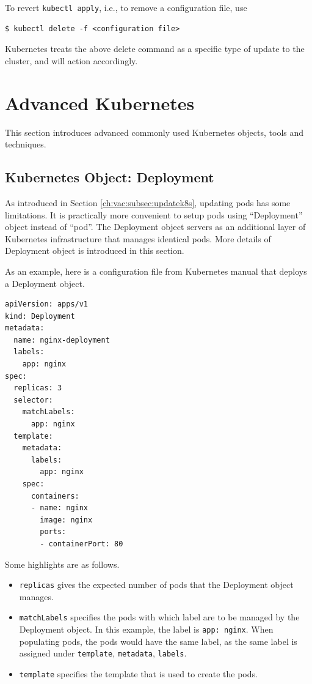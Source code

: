 To revert \verb|kubectl apply|, i.e., to remove a configuration file, use
\begin{lstlisting}
$ kubectl delete -f <configuration file>
\end{lstlisting}
Kubernetes treats the above delete command as a specific type of update to the cluster, and will action accordingly.

\section{Advanced Kubernetes}

This section introduces advanced commonly used Kubernetes objects, tools and techniques.

\subsection{Kubernetes Object: Deployment} \label{ch:vac:subsec:deployment}

As introduced in Section \ref{ch:vac:subsec:updatek8s}, updating pods has some limitations. It is practically more convenient to setup pods using ``Deployment'' object instead of ``pod''. The Deployment object servers as an additional layer of Kubernetes infrastructure that manages identical pods. More details of Deployment object is introduced in this section.

As an example, here is a configuration file from Kubernetes manual that deploys a Deployment object.
\begin{lstlisting}
apiVersion: apps/v1
kind: Deployment
metadata:
  name: nginx-deployment
  labels:
    app: nginx
spec:
  replicas: 3
  selector:
    matchLabels:
      app: nginx
  template:
    metadata:
      labels:
        app: nginx
    spec:
      containers:
      - name: nginx
        image: nginx
        ports:
        - containerPort: 80
\end{lstlisting}
Some highlights are as follows.
\begin{itemize}
  \item \verb|replicas| gives the expected number of pods that the Deployment object manages.
  \item \verb|matchLabels| specifies the pods with which label are to be managed by the Deployment object. In this example, the label is \verb|app: nginx|. When populating pods, the pods would have the same label, as the same label is assigned under \verb|template|, \verb|metadata|, \verb|labels|.
  \item \verb|template| specifies the template that is used to create the pods.
\end{itemize}

